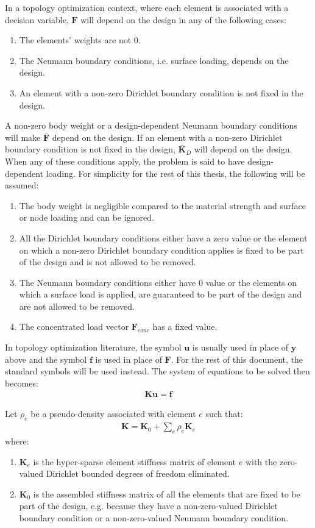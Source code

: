 	In a topology optimization context, where each element is associated with a decision variable, $\bm{F}$ will depend on the design in any of the following cases:
	\begin{enumerate}
	    \item The elements' weights are not 0.
	    \item The Neumann boundary conditions, i.e. surface loading, depends on the design.
	    \item An element with a non-zero Dirichlet boundary condition is not fixed in the design.
	\end{enumerate}
	A non-zero body weight or a design-dependent Neumann boundary conditions will make $\bm{\bar{F}}$ depend on the design. If an element with a non-zero Dirichlet boundary condition is not fixed in the design, $\bm{\bar{K}}_D$ will depend on the design. When any of these conditions apply, the problem is said to have design-dependent loading. For simplicity for the rest of this thesis, the following will be assumed:
	\begin{enumerate}
	    \item The body weight is negligible compared to the material strength and surface or node loading and can be ignored.
	    \item All the Dirichlet boundary conditions either have a zero value or the element on which a non-zero Dirichlet boundary condition applies is fixed to be part of the design and is not allowed to be removed.
	    \item The Neumann boundary conditions either have 0 value or the elements on which a surface load is applied, are guaranteed to be part of the design and are not allowed to be removed.
	    \item The concentrated load vector $\bm{F}_{conc}$ has a fixed value.
	\end{enumerate}
	In topology optimization literature, the symbol $\bm{u}$ is usually used in place of $\bm{y}$ above and the symbol $\bm{f}$ is used in place of $\bm{F}$. For the rest of this document, the standard symbols will be used instead. The system of equations to be solved then becomes:
	\begin{align}
		\bm{K}\bm{u} = \bm{f}
	\end{align}
    
    Let $\rho_e$ be a pseudo-density associated with element $e$ such that:
    \begin{align}
        \bm{K} = \bm{K}_0 + \sum_e \rho_e \bm{K}_e
    \end{align}
    where:
    \begin{enumerate}
        \item $\bm{K}_e$ is the hyper-sparse element stiffness matrix of element $e$ with the zero-valued Dirichlet bounded degrees of freedom eliminated.
        \item $\bm{K}_0$ is the assembled stiffness matrix of all the elements that are fixed to be part of the design, e.g. because they have a non-zero-valued Dirichlet boundary condition or a non-zero-valued Neumann boundary condition.
    \end{enumerate}

